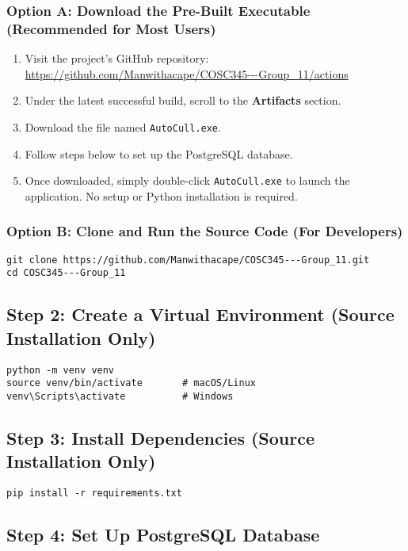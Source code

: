 \documentclass[12pt,a4paper]{article}
\begin{document}
\subsubsection*{Option A: Download the Pre-Built Executable (Recommended for Most Users)}
\begin{enumerate}[label=\arabic*.]
    \item Visit the project's GitHub repository:  
    \url{https://github.com/Manwithacape/COSC345---Group_11/actions}
    \item Under the latest successful build, scroll to the \textbf{Artifacts} section.
    \item Download the file named \texttt{AutoCull.exe}.
    \item Follow steps below to set up the PostgreSQL database.
    \item Once downloaded, simply double-click \texttt{AutoCull.exe} to launch the application.  
    No setup or Python installation is required.
\end{enumerate}

\subsubsection*{Option B: Clone and Run the Source Code (For Developers)}
\begin{lstlisting}[style=console]
git clone https://github.com/Manwithacape/COSC345---Group_11.git
cd COSC345---Group_11
\end{lstlisting}

\subsection{Step 2: Create a Virtual Environment (Source Installation Only)}
\begin{lstlisting}[style=console]
python -m venv venv
source venv/bin/activate       # macOS/Linux
venv\Scripts\activate          # Windows
\end{lstlisting}

\subsection{Step 3: Install Dependencies (Source Installation Only)}
\begin{lstlisting}[style=console]
pip install -r requirements.txt
\end{lstlisting}

\subsection{Step 4: Set Up PostgreSQL Database}
\end{document}
